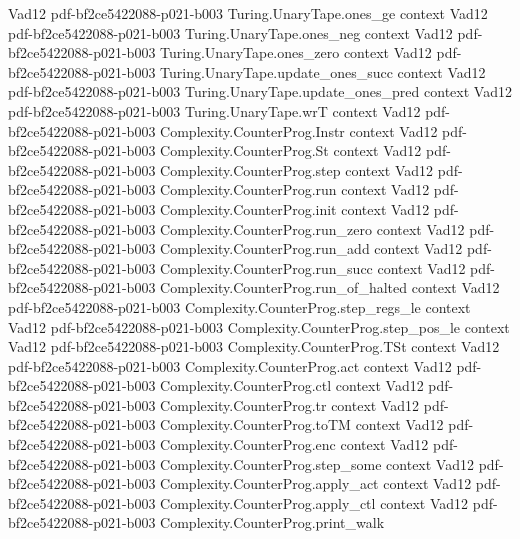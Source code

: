\begin{theorem}
  {Vad12}
  {pdf-bf2ce5422088-p021-b003}
\proofstep
  {Turing.UnaryTape.ones_ge}
  {context}
  {Vad12}
  {pdf-bf2ce5422088-p021-b003}
\proofstep
  {Turing.UnaryTape.ones_neg}
  {context}
  {Vad12}
  {pdf-bf2ce5422088-p021-b003}
\proofstep
  {Turing.UnaryTape.ones_zero}
  {context}
  {Vad12}
  {pdf-bf2ce5422088-p021-b003}
\proofstep
  {Turing.UnaryTape.update_ones_succ}
  {context}
  {Vad12}
  {pdf-bf2ce5422088-p021-b003}
\proofstep
  {Turing.UnaryTape.update_ones_pred}
  {context}
  {Vad12}
  {pdf-bf2ce5422088-p021-b003}
\proofstep
  {Turing.UnaryTape.wrT}
  {context}
  {Vad12}
  {pdf-bf2ce5422088-p021-b003}
\proofstep
  {Complexity.CounterProg.Instr}
  {context}
  {Vad12}
  {pdf-bf2ce5422088-p021-b003}
\proofstep
  {Complexity.CounterProg.St}
  {context}
  {Vad12}
  {pdf-bf2ce5422088-p021-b003}
\proofstep
  {Complexity.CounterProg.step}
  {context}
  {Vad12}
  {pdf-bf2ce5422088-p021-b003}
\proofstep
  {Complexity.CounterProg.run}
  {context}
  {Vad12}
  {pdf-bf2ce5422088-p021-b003}
\proofstep
  {Complexity.CounterProg.init}
  {context}
  {Vad12}
  {pdf-bf2ce5422088-p021-b003}
\proofstep
  {Complexity.CounterProg.run_zero}
  {context}
  {Vad12}
  {pdf-bf2ce5422088-p021-b003}
\proofstep
  {Complexity.CounterProg.run_add}
  {context}
  {Vad12}
  {pdf-bf2ce5422088-p021-b003}
\proofstep
  {Complexity.CounterProg.run_succ}
  {context}
  {Vad12}
  {pdf-bf2ce5422088-p021-b003}
\proofstep
  {Complexity.CounterProg.run_of_halted}
  {context}
  {Vad12}
  {pdf-bf2ce5422088-p021-b003}
\proofstep
  {Complexity.CounterProg.step_regs_le}
  {context}
  {Vad12}
  {pdf-bf2ce5422088-p021-b003}
\proofstep
  {Complexity.CounterProg.step_pos_le}
  {context}
  {Vad12}
  {pdf-bf2ce5422088-p021-b003}
\proofstep
  {Complexity.CounterProg.TSt}
  {context}
  {Vad12}
  {pdf-bf2ce5422088-p021-b003}
\proofstep
  {Complexity.CounterProg.act}
  {context}
  {Vad12}
  {pdf-bf2ce5422088-p021-b003}
\proofstep
  {Complexity.CounterProg.ctl}
  {context}
  {Vad12}
  {pdf-bf2ce5422088-p021-b003}
\proofstep
  {Complexity.CounterProg.tr}
  {context}
  {Vad12}
  {pdf-bf2ce5422088-p021-b003}
\proofstep
  {Complexity.CounterProg.toTM}
  {context}
  {Vad12}
  {pdf-bf2ce5422088-p021-b003}
\proofstep
  {Complexity.CounterProg.enc}
  {context}
  {Vad12}
  {pdf-bf2ce5422088-p021-b003}
\proofstep
  {Complexity.CounterProg.step_some}
  {context}
  {Vad12}
  {pdf-bf2ce5422088-p021-b003}
\proofstep
  {Complexity.CounterProg.apply_act}
  {context}
  {Vad12}
  {pdf-bf2ce5422088-p021-b003}
\proofstep
  {Complexity.CounterProg.apply_ctl}
  {context}
  {Vad12}
  {pdf-bf2ce5422088-p021-b003}
\proofstep
  {Complexity.CounterProg.print_walk}

\end{theorem}
